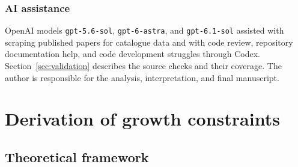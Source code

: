 \documentclass[pdflatex,sn-basic]{sn-jnl}
\begin{document}
\subsubsection{AI assistance}
OpenAI models \texttt{gpt-5.6-sol}, \texttt{gpt-6-astra}, and
\texttt{gpt-6.1-sol} assisted with scraping published papers for catalogue data
and with code review, repository documentation help, and code development
struggles through Codex. Section~\ref{sec:validation} describes
the source checks and their coverage. The author is responsible for the
analysis, interpretation, and final manuscript.

\section{Derivation of growth constraints}

\subsection{Theoretical framework}
\label{sec:theory}
\end{document}
